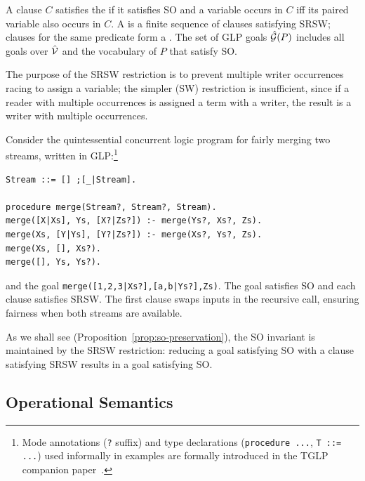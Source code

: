 \begin{definition}
\label{def:glp-program}
A clause $C$ satisfies the  if it satisfies SO and a variable occurs in $C$ iff its paired variable also occurs in $C$.
A  is a finite sequence of clauses satisfying SRSW; clauses for the same predicate form a .
The set of GLP goals $\hat{\mathcal{G}}(P)$ includes all goals over $\hat{\mathcal{V}}$ and the vocabulary of $P$ that satisfy SO.
\end{definition}
The purpose of the SRSW restriction is to prevent multiple writer occurrences racing to assign a variable; the simpler (SW) restriction is insufficient, since if a reader with multiple occurrences is assigned a term with a writer, the result is a writer with multiple occurrences.
\begin{example}
\label{ex:merge}
Consider the quintessential concurrent logic program for fairly merging two streams, written in GLP:\footnote{Mode annotations (\texttt{?} suffix) and type declarations (\texttt{procedure ...}, \texttt{T ::= ...}) used informally in examples are formally introduced in the TGLP companion paper~\cite{shapiro2026types}.}
\begin{verbatim}
Stream ::= [] ;[_|Stream].

procedure merge(Stream?, Stream?, Stream).
merge([X|Xs], Ys, [X?|Zs?]) :- merge(Ys?, Xs?, Zs).
merge(Xs, [Y|Ys], [Y?|Zs?]) :- merge(Xs?, Ys?, Zs).
merge(Xs, [], Xs?).
merge([], Ys, Ys?).
\end{verbatim}
and the goal \verb=merge([1,2,3|Xs?],[a,b|Ys?],Zs)=. The goal satisfies SO and each clause satisfies SRSW. The first clause swaps inputs in the recursive call, ensuring fairness when both streams are available.
\end{example}


As we shall see (Proposition~\ref{prop:so-preservation}), the SO invariant is maintained by the SRSW restriction: reducing a goal satisfying SO with a clause satisfying SRSW results in a goal satisfying SO. 

\subsection{Operational Semantics}
\label{sec:glp-operational}

